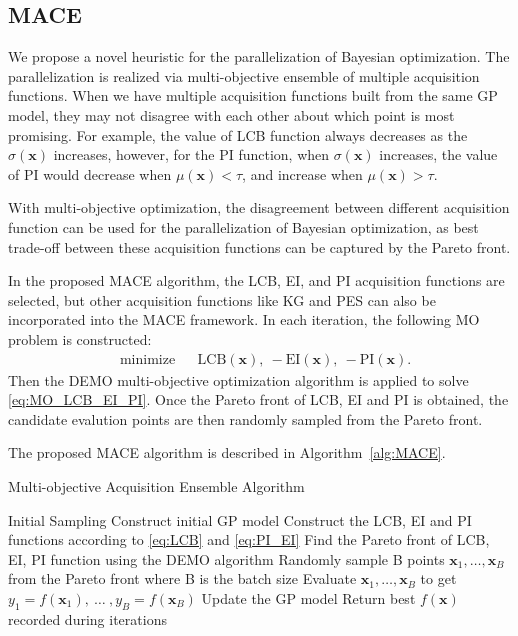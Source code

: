 \subsection{MACE}

We propose a novel heuristic for the parallelization of Bayesian optimization.
The parallelization is realized via multi-objective ensemble of multiple
acquisition functions. When we have multiple acquisition functions built from
the same GP model, they may not disagree with each other about which point is
most promising. For example, the value of LCB function always decreases as the
$\sigma(\bm{x})$ increases, however, for the PI function, when $\sigma(\bm{x})$
increases, the value of PI would decrease when $\mu(\bm{x}) < \tau$, and
increase when $\mu(\bm{x}) > \tau$.


With multi-objective optimization, the disagreement between different
acquisition function can be used for the parallelization of Bayesian
optimization, as best trade-off between these acquisition functions can be
captured by the Pareto front.

In the proposed MACE algorithm, the LCB, EI, and PI acquisition functions are selected, but other acquisition functions like KG and PES can also be incorporated into the MACE framework. In each iteration, the following MO problem is constructed:
\begin{equation}
    \label{eq:MO_LCB_EI_PI}
    \begin{aligned}
        & \text{minimize} & & \mathrm{LCB}(\bm{x}),~-\mathrm{EI}(\bm{x}),~-\mathrm{PI}(\bm{x}).
    \end{aligned}
\end{equation}
Then the DEMO multi-objective optimization algorithm is applied to solve \eqref{eq:MO_LCB_EI_PI}. Once the Pareto front of LCB, EI and PI is obtained, the candidate evalution points are then randomly sampled from the Pareto front.


The proposed MACE algorithm is described in Algorithm~\ref{alg:MACE}.


\begin{algorithm}
\caption{Multi-objective Acquisition Ensemble Algorithm}
\label{alg:MACE}
\begin{algorithmic}[1]
\STATE Initial Sampling
\STATE Construct initial GP model
    \STATE Construct the LCB, EI and PI functions according to \eqref{eq:LCB} and \eqref{eq:PI_EI}
    \STATE Find the Pareto front of LCB, EI, PI function using the DEMO algorithm
    \STATE Randomly sample B points $\bm{x}_1, \dots, \bm{x}_B$ from the Pareto front where B is the batch size
    \STATE Evaluate $\bm{x}_1, \dots, \bm{x}_B$ to get $y_1 = f(\bm{x}_1),~\dots~,y_B = f(\bm{x}_B)$
    \STATE Update the GP model
\ENDFOR
\STATE Return best $f(\bm{x})$ recorded during iterations
\end{algorithmic}
\end{algorithm}
